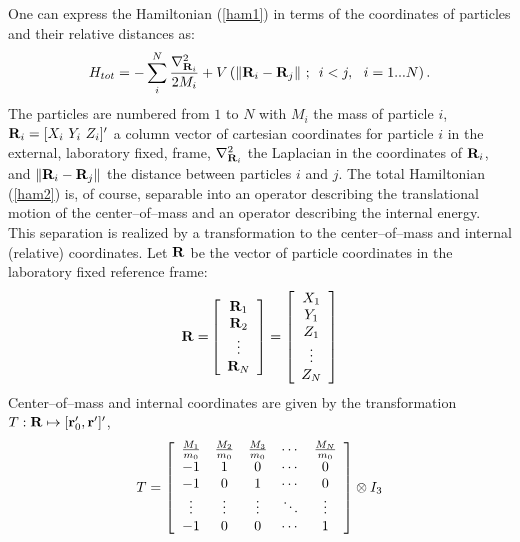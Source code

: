 One can express the Hamiltonian (\ref{ham1})
in terms of the coordinates of particles and
their relative distances as: 
\begin{equation}
H_{tot}=-\sum_i^N\frac{\nabla _{{\bf R}_i}^2}{2M_i}+V\left( \left\| 
{\bf R}_i-{\bf R}_j\right\| \,;\,\,\,i<j,\,\,\,\,i=1...N\right) .
\label{ham2}
\end{equation}
The particles are numbered from $1$ to $N$ with $M_i$ the mass of particle 
$i$, ${\bf R}_i=[X_i\,\,Y_i\,\,Z_i]^{\prime }$ a column vector of cartesian
coordinates for particle $i$ in the external, laboratory fixed, frame, $%
\nabla _{{\bf R}_i}^2$ the Laplacian in the coordinates 
of ${\bf R}_i$, and $\left\| {\bf R}_i-{\bf R}_j\right\| $ 
the distance between
particles $i$ and $j$. The total Hamiltonian (\ref{ham2}) is, of
course, separable into an operator describing the translational motion of
the center--of--mass and an operator describing the internal energy. This
separation is realized by a transformation to 
the center--of--mass and internal
(relative) coordinates.
Let ${\bf R}$ be the vector of particle coordinates in the laboratory
fixed reference frame:
\begin{equation}
{\bf R=}\left[ 
\begin{array}{c}
{\bf R}_1 \\ 
{\bf R}_2 \\ 
\vdots  \\ 
{\bf R}_N
\end{array}
\right] =\left[ 
\begin{array}{c}
X_1 \\ 
Y_1 \\ 
Z_1 \\ 
\vdots  \\ 
Z_N
\end{array}
\right] 
\end{equation}
Center--of--mass and internal coordinates are given by the transformation $T:%
{\bf R}\mapsto [{\bf r}_0^{\prime },{\bf r}^{\prime }]^{\prime }$,
\begin{equation}
T=\left[ 
\begin{array}{ccccc}
\frac{M_1}{m_0} & \frac{M_2}{m_0} & \frac{M_3}{m_0} & \cdots  & \frac{M_N}{%
m_0} \\ 
-1 & 1 & 0 & \cdots  & 0 \\ 
-1 & 0 & 1 & \cdots  & 0 \\ 
\vdots  & \vdots  & \vdots  & \ddots  & \vdots  \\ 
-1 & 0 & 0 & \cdots  & 1
\end{array}
\right] \otimes I_3  \label{Ttran}
\end{equation}
